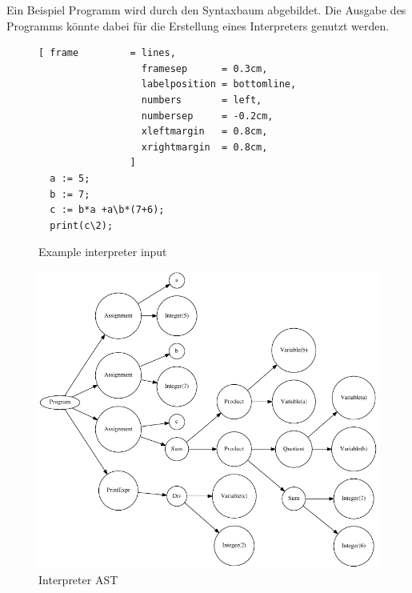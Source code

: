 Ein Beispiel Programm  wird durch den Syntaxbaum  abgebildet.
Die Ausgabe des Programms könnte dabei für die Erstellung eines Interpreters genutzt werden.
\begin{figure}[!htb]

\begin{Verbatim}[ frame         = lines, 
                  framesep      = 0.3cm, 
                  labelposition = bottomline,
                  numbers       = left,
                  numbersep     = -0.2cm,
                  xleftmargin   = 0.8cm,
                  xrightmargin  = 0.8cm,
                ]
  a := 5;
  b := 7;
  c := b*a +a\b*(7+6);
  print(c\2);
\end{Verbatim}
\caption{Example interpreter input}
\label{fig:example_interpreter_input}
\end{figure}

\begin{figure}[!htb]
	\centering
		\includegraphics{simple_interpreter_tree.pdf}
	\caption{Interpreter AST}
	\label{fig:interpreter_tree}
\end{figure}

